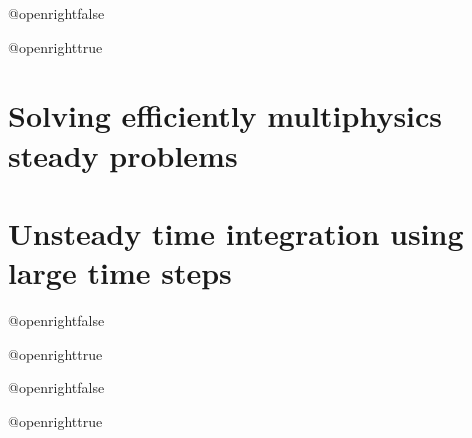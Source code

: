 



\frontmatter

  \makeflyleaf

  \csname @openrightfalse\endcsname
  

  \tableofcontents
  \csname @openrighttrue\endcsname


\mainmatter

  

  \part{Solving efficiently multiphysics steady problems}

    

    \clearpage\null\thispagestyle{empty}
    

    

  \clearpage\null\thispagestyle{empty}
  \part{Unsteady time integration using large time steps}

      

      

  \clearpage\null\thispagestyle{empty}
  

  \clearpage\null\thispagestyle{empty}
  \csname @openrightfalse\endcsname
  
  \csname @openrighttrue\endcsname

\backmatter

  \raggedbottom

  
  

  \csname @openrightfalse\endcsname
  
  \csname @openrighttrue\endcsname


